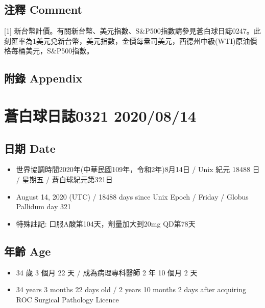 \documentclass[a5paper, 11pt
]{book}
\providecommand{\tightlist}{%
  \setlength{\itemsep}{0pt}\setlength{\parskip}{0pt}}
\begin{document}
\hypertarget{ux6ce8ux91cb-comment-73}{%
\subsection{注釋 Comment}\label{ux6ce8ux91cb-comment-73}}

{[}1{]}
新台幣計價。有關新台幣、美元指數、S\&P500指數請參見蒼白球日誌0247。此刻匯率為1美元兌新台幣，美元指數，金價每盎司美元，西德州中級(WTI)原油價格每桶美元，S\&P500指數。

\hypertarget{ux9644ux9304-appendix-73}{%
\subsection{附錄 Appendix}\label{ux9644ux9304-appendix-73}}

\hypertarget{ux84bcux767dux7403ux65e5ux8a8c0321-20200814}{%
\section{蒼白球日誌0321
2020/08/14}\label{ux84bcux767dux7403ux65e5ux8a8c0321-20200814}}

\hypertarget{ux65e5ux671f-date-74}{%
\subsection{日期 Date}\label{ux65e5ux671f-date-74}}

\begin{itemize}
\tightlist
\item
  世界協調時間2020年(中華民國109年，令和2年)8月14日 / Unix 紀元 18488 日
  / 星期五 / 蒼白球紀元第321日
\item
  August 14, 2020 (UTC) / 18488 days since Unix Epoch / Friday / Globus
  Pallidum day 321
\item
  特殊註記: 口服A酸第104天，劑量加大到20mg QD第78天
\end{itemize}

\hypertarget{ux5e74ux9f61-age-74}{%
\subsection{年齡 Age}\label{ux5e74ux9f61-age-74}}

\begin{itemize}
\tightlist
\item
  34 歲 3 個月 22 天 / 成為病理專科醫師 2 年 10 個月 2 天
\item
  34 years 3 months 22 days old / 2 years 10 months 2 days after
  acquiring ROC Surgical Pathology Licence
\end{itemize}
\end{document}
